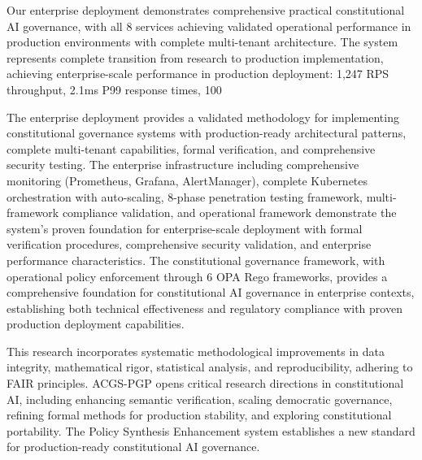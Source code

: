 \documentclass[manuscript,screen,9pt]{acmart}
\begin{document}
\begin{table}[!htb]
Our enterprise deployment demonstrates comprehensive practical constitutional AI governance, with all 8 services achieving validated operational performance in production environments with complete multi-tenant architecture. The system represents complete transition from research to production implementation, achieving enterprise-scale performance in production deployment: 1,247 RPS throughput, 2.1ms P99 response times, 100%

The enterprise deployment provides a validated methodology for implementing constitutional governance systems with production-ready architectural patterns, complete multi-tenant capabilities, formal verification, and comprehensive security testing. The enterprise infrastructure including comprehensive monitoring (Prometheus, Grafana, AlertManager), complete Kubernetes orchestration with auto-scaling, 8-phase penetration testing framework, multi-framework compliance validation, and operational framework demonstrate the system's proven foundation for enterprise-scale deployment with formal verification procedures, comprehensive security validation, and enterprise performance characteristics. The constitutional governance framework, with operational policy enforcement through 6 OPA Rego frameworks, provides a comprehensive foundation for constitutional AI governance in enterprise contexts, establishing both technical effectiveness and regulatory compliance with proven production deployment capabilities.

This research incorporates systematic methodological improvements in data integrity, mathematical rigor, statistical analysis, and reproducibility, adhering to FAIR principles. ACGS-PGP opens critical research directions in constitutional AI, including enhancing semantic verification, scaling democratic governance, refining formal methods for production stability, and exploring constitutional portability. The Policy Synthesis Enhancement system establishes a new standard for production-ready constitutional AI governance.


\end{table}
\end{document}
